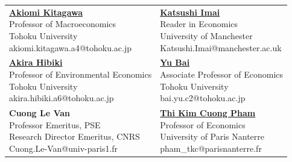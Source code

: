 \documentclass[12pt]{article}
\begin{document}
\begin{center}
\begin{tabular}{p{7.5cm} p{7.5cm}}
\parbox[t]{7.5cm}{
    \textbf{\href{https://researchmap.jp/read0118970?lang=en}{Akiomi Kitagawa}} \\
    Professor of Macroeconomics \\
    Tohoku University \\
    akiomi.kitagawa.a4@tohoku.ac.jp
}
&
\parbox[t]{7.5cm}{
    \textbf{\href{https://research.manchester.ac.uk/en/persons/katsushi.imai}{Katsushi Imai}} \\
    Reader in Economics \\
    University of Manchester \\
    Katsushi.Imai@manchester.ac.uk
}
\\[4.5em]
\parbox[t]{7.5cm}{
    \textbf{\href{https://researchmap.jp/read0006101}{Akira Hibiki}} \\
    Professor of Environmental Economics \\
    Tohoku University \\
    akira.hibiki.a6@tohoku.ac.jp
}
&
\parbox[t]{7.5cm}{
    \textbf{\href{https://sites.google.com/view/yubaiecon/}{Yu Bai}} \\
    Associate Professor of Economics \\
    Tohoku University \\
    bai.yu.c2@tohoku.ac.jp
}
\\[4.5em]
\parbox[t]{7.5cm}{
    \textbf{Cuong Le Van} \\
    Professor Emeritus, PSE \\
    Research Director Emeritus, CNRS \\
    Cuong.Le-Van@univ-paris1.fr
}
&
\parbox[t]{7.5cm}{
    \textbf{\href{https://economix.fr/en/membre/pham-thi-kim-cuong}{Thi Kim Cuong Pham}} \\
    Professor of Economics \\
    University of Paris Nanterre \\
    pham\_tkc@parisnanterre.fr
}
\\
\end{tabular}
\end{center}
\end{document}
